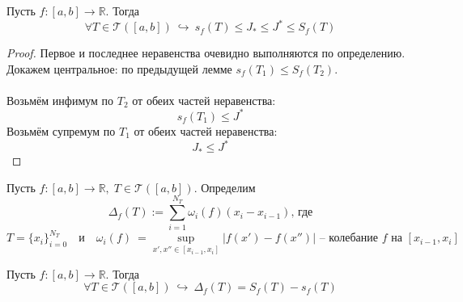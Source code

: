 \documentclass[11pt]{article}
\begin{document}
\begin{lemma}
    Пусть $f \colon [a, b] \to \mathbb{R}$. Тогда \[\forall T \in \mathcal{T}([a, b]) 
    \ \hookrightarrow \ s_f(T) \leq J_{\ast} \leq J^{\ast} \leq S_f(T)\]
\end{lemma}

\begin{proof}
    Первое и последнее неравенства очевидно выполняются по определению. Докажем центральное: 
    по предыдущей лемме $s_f(T_1) \leq S_f(T_2)$. \\ \\ Возьмём инфимум по $T_2$ от обеих частей неравенства: 
    \[s_f(T_1) \leq J^{\ast}\] Возьмём супремум по $T_1$ от обеих частей неравенства: \[J_{\ast} \leq J^{\ast}\]
\end{proof}

\begin{definition}
    Пусть $f \colon [a, b] \to \mathbb{R}, \; T \in \mathcal{T}([a, b])$. Определим
    \[\Delta_f(T) := \sum_{i = 1}^{N_T} \omega_i(f)(x_i - x_{i - 1}) \text{, где}\]
    \[T = \{x_i\}^{N_T}_{i = 0} \quad \text{и} \quad \omega_i(f) \ = \sup_{x', 
    x'' \in [x_{i - 1}, x_i]} \left\lvert f(x') - f(x'') \right\rvert 
    \text{ -- колебание } f \text{ на } [x_{i - 1}, x_i]\]
\end{definition}

\begin{lemma}
    Пусть $f \colon [a, b] \to \mathbb{R}$. Тогда \[\forall T \in \mathcal{T}([a, b]) 
    \ \hookrightarrow \ \Delta_f(T) = S_f(T) - s_f(T)\]
\end{lemma}
\end{document}
